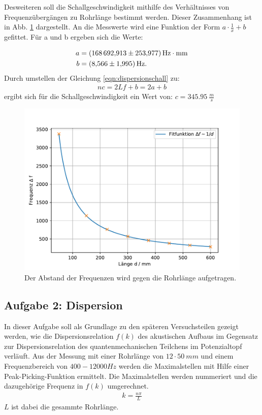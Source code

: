 \FloatBarrier
Desweiteren soll die Schallgeschwindigkeit mithilfe des Verhältnisses von Frequenzübergängen zu Rohrlänge bestimmt werden.
Dieser Zusammenhang ist in Abb. \ref{fig.1/x} dargestellt.
An die Messwerte wird eine Funktion der Form $a\cdot\frac{1}{x}+b$ gefittet.
Für a und b ergeben sich die Werte:

\begin{align*}
  a&=\SI{168692.913\pm253.977}{Hz \cdot mm}\\
  b&=\SI{8.566\pm1.995}{Hz}.\\
\end{align*}
Durch umstellen der Gleichung \ref{eqn:dispersionschall} zu:
\begin{align*}
  nc=2Lf+b=2a+b
\end{align*}
ergibt sich für die Schallgeschwindigkeit ein Wert von: $c = \SI{345.95}{\frac{m}{s}}$
\begin{figure}[h!]
  \centering
  \includegraphics[width=\textwidth]{geschi.pdf}
  \caption{Der Abstand der Frequenzen wird gegen die Rohrlänge aufgetragen.}
  \label{fig.1/x}
\end{figure}
\FloatBarrier

\subsection{Aufgabe 2: Dispersion}
\FloatBarrier
In dieser Aufgabe soll als Grundlage zu den späteren Versuchsteilen gezeigt werden, wie die Dispersionsrelation $f(k)$ des akustischen Aufbaus im Gegensatz zur Dispersionsrelation des quantenmechanischen Teilchens im Potenzialtopf verläuft.
Aus der Messung mit einer Rohrlänge von $12\cdot\SI{50}{mm}$ und einem Frequenzbereich von $400-12000\si{Hz}$ werden die Maximalstellen mit Hilfe einer Peak-Picking-Funktion ermittelt.
Die Maximalstellen werden nummeriert und die dazugehörige Frequenz in $f(k)$ umgerechnet.
\begin{align}
  k= \frac{n \pi}{L}
\end{align}
$L$ ist dabei die gesammte Rohrlänge.

